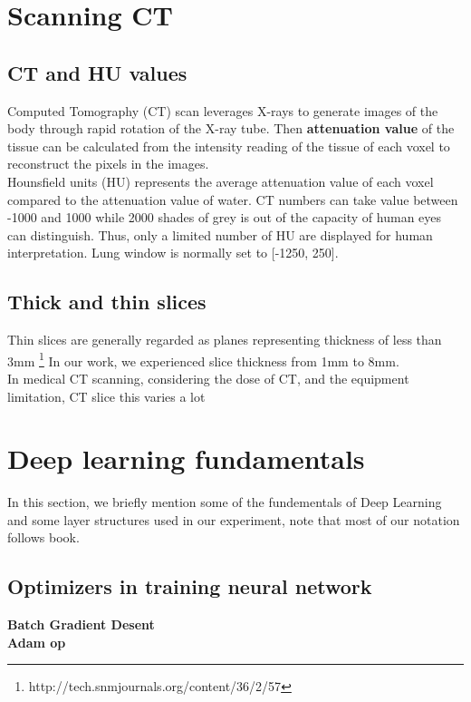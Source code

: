 \section{Scanning CT}

\subsection{CT and HU values}
Computed Tomography (CT) scan leverages X-rays to generate images of the body through rapid rotation of the X-ray tube. Then \textbf{attenuation value} of the tissue can be calculated from the intensity reading of the tissue of each voxel to reconstruct the pixels in the images.\\

Hounsfield units (HU) represents the average attenuation value of each voxel compared to the attenuation value of water. CT numbers can take value between -1000 and 1000 while 2000 shades of grey is out of the capacity of human eyes can distinguish. Thus, only a limited number of HU are displayed for human interpretation. Lung window is normally set to [-1250, 250].

\subsection{Thick and thin slices}
Thin slices are generally regarded as planes representing thickness of less than 3mm \footnote{http://tech.snmjournals.org/content/36/2/57} In our work, we experienced slice thickness from 1mm to 8mm. \\
{\color{red} In medical CT scanning, considering the dose of CT, and the equipment limitation, CT slice this varies a lot}

\newpage

\section{Deep learning fundamentals}
In this section, we briefly mention some of the fundementals of Deep Learning and some layer structures used in our experiment, note that most of our notation follows book\cite{Goodfellow-et-al-2016}.

\subsection{Optimizers in training neural network}
\textbf{Batch Gradient Desent}\\
\textbf{Adam op}\\

